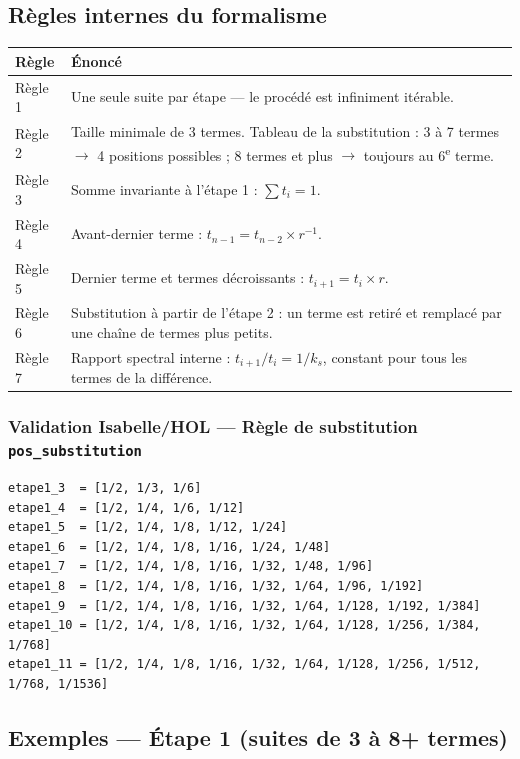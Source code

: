 \documentclass[11pt,a4paper]{article}
\begin{document}
\subsection{Règles internes du formalisme}

\begin{longtable}{p{2.2cm}p{11cm}}
\toprule
\textbf{Règle} & \textbf{Énoncé} \\
\midrule
\endhead
Règle 1 & Une seule suite par étape --- le procédé est infiniment itérable. \\
Règle 2 & Taille minimale de 3 termes. Tableau de la substitution : 3 à 7 termes $\to$ 4 positions possibles ; 8 termes et plus $\to$ toujours au 6\textsuperscript{e} terme. \\
Règle 3 & Somme invariante à l'étape 1 : $\sum t_i = 1$. \\
Règle 4 & Avant-dernier terme : $t_{n-1} = t_{n-2} \times r^{-1}$. \\
Règle 5 & Dernier terme et termes décroissants : $t_{i+1} = t_i \times r$. \\
Règle 6 & Substitution à partir de l'étape 2 : un terme est retiré et remplacé par une chaîne de termes plus petits. \\
Règle 7 & Rapport spectral interne : $t_{i+1}/t_i = 1/k_s$, constant pour tous les termes de la différence. \\
\bottomrule
\end{longtable}

\subsubsection*{Validation Isabelle/HOL --- Règle de substitution \texttt{pos\_substitution}}

\begin{verbatim}
etape1_3  = [1/2, 1/3, 1/6]
etape1_4  = [1/2, 1/4, 1/6, 1/12]
etape1_5  = [1/2, 1/4, 1/8, 1/12, 1/24]
etape1_6  = [1/2, 1/4, 1/8, 1/16, 1/24, 1/48]
etape1_7  = [1/2, 1/4, 1/8, 1/16, 1/32, 1/48, 1/96]
etape1_8  = [1/2, 1/4, 1/8, 1/16, 1/32, 1/64, 1/96, 1/192]
etape1_9  = [1/2, 1/4, 1/8, 1/16, 1/32, 1/64, 1/128, 1/192, 1/384]
etape1_10 = [1/2, 1/4, 1/8, 1/16, 1/32, 1/64, 1/128, 1/256, 1/384, 1/768]
etape1_11 = [1/2, 1/4, 1/8, 1/16, 1/32, 1/64, 1/128, 1/256, 1/512, 1/768, 1/1536]
\end{verbatim}

\subsection{Exemples --- Étape 1 (suites de 3 à 8+ termes)}
\end{document}
